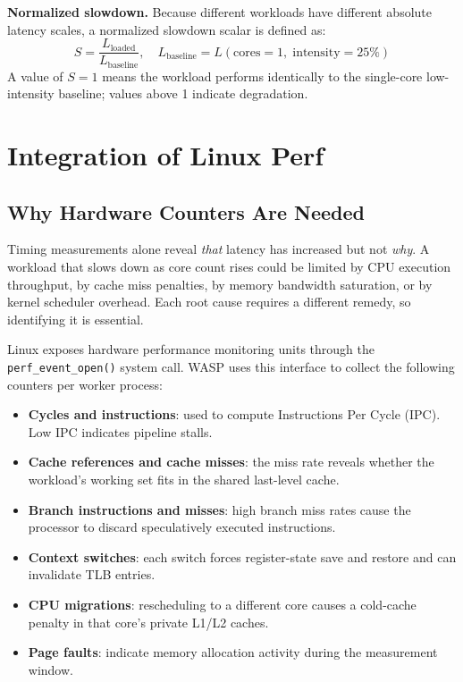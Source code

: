 \documentclass[conference]{IEEEtran}
\begin{document}
\textbf{Normalized slowdown.} Because different workloads have different
absolute latency scales, a normalized slowdown scalar is defined as:
\begin{equation}
S = \frac{L_{\text{loaded}}}{L_{\text{baseline}}},\quad
L_{\text{baseline}} = L(\text{cores}=1,\;\text{intensity}=25\%)
\label{eq:slowdown}
\end{equation}
A value of $S=1$ means the workload performs identically to the single-core
low-intensity baseline; values above 1 indicate degradation.

\section{Integration of Linux Perf}
\label{sec:perf}

\subsection{Why Hardware Counters Are Needed}

Timing measurements alone reveal \emph{that} latency has increased but not
\emph{why}.  A workload that slows down as core count rises could be limited
by CPU execution throughput, by cache miss penalties, by memory bandwidth
saturation, or by kernel scheduler overhead.  Each root cause requires a
different remedy, so identifying it is essential.

Linux exposes hardware performance monitoring units through the
\texttt{perf\_event\_open()} system call.  WASP uses this interface to
collect the following counters per worker process:
\begin{itemize}
  \item \textbf{Cycles and instructions}: used to compute Instructions Per
        Cycle (IPC).  Low IPC indicates pipeline stalls.
  \item \textbf{Cache references and cache misses}: the miss rate reveals
        whether the workload's working set fits in the shared last-level cache.
  \item \textbf{Branch instructions and misses}: high branch miss rates cause
        the processor to discard speculatively executed instructions.
  \item \textbf{Context switches}: each switch forces register-state save and
        restore and can invalidate TLB entries.
  \item \textbf{CPU migrations}: rescheduling to a different core causes a
        cold-cache penalty in that core's private L1/L2 caches.
  \item \textbf{Page faults}: indicate memory allocation activity during the
        measurement window.
\end{itemize}
\end{document}
